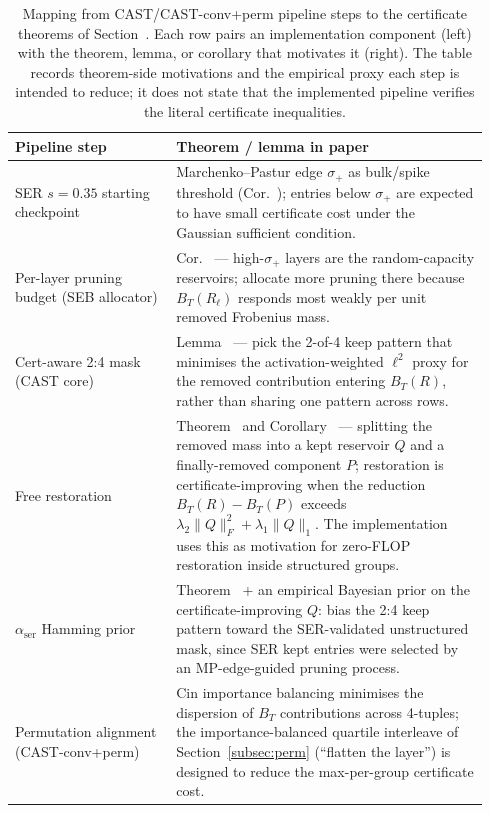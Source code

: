 \documentclass[11pt]{article}
\makeatletter
\theoremstyle{plain}
\theoremstyle{definition}
\theoremstyle{remark}
\newcommand{\1}{\mathbf{1}}
\newcommand{\mainref}[1]{\@ifundefined{r@main-#1}{\@ifundefined{r@#1}{\ref*{orone-#1}}{\ref{#1}}}{\ref*{main-#1}}}
\makeatother
\begin{document}
\begin{table}[ht]
\centering
\caption{Mapping from CAST/CAST-conv+perm pipeline steps to the certificate theorems of Section~\mainref{Main_theory_gen}.  Each row pairs an implementation component (left) with the theorem, lemma, or corollary that motivates it (right).  The table records theorem-side motivations and the empirical proxy each step is intended to reduce; it does not state that the implemented pipeline verifies the literal certificate inequalities.}
\label{tab:cast_theory_map}
\scriptsize
\setlength{\tabcolsep}{4pt}
\begin{tabular}{p{0.32\linewidth}p{0.62\linewidth}}
\toprule
Pipeline step & Theorem / lemma in paper \\
\midrule
SER \(s=0.35\) starting checkpoint
  & Marchenko--Pastur edge \(\sigma_+\) as bulk/spike threshold (Cor.~\mainref{cor:mp_edge_data_path_budget}); entries below \(\sigma_+\) are expected to have small certificate cost under the Gaussian sufficient condition. \\
\addlinespace[2pt]
Per-layer pruning budget (SEB allocator)
  & Cor.~\mainref{cor:mp_edge_data_path_budget} --- high-\(\sigma_+\) layers are the random-capacity reservoirs; allocate more pruning there because \(B_T(R_\ell)\) responds most weakly per unit removed Frobenius mass. \\
\addlinespace[2pt]
Cert-aware 2:4 mask (CAST core)
  & Lemma~\mainref{lem:deterministic_ce_path_bound} --- pick the 2-of-4 keep pattern that minimises the activation-weighted \(\ell^2\) proxy for the removed contribution entering \(B_T(R)\), rather than sharing one pattern across rows. \\
\addlinespace[2pt]
Free restoration
  & Theorem~\mainref{thm:deterministic_prune_restore_certificate} and Corollary~\mainref{cor:restoration_improves_certificate} --- splitting the removed mass into a kept reservoir \(Q\) and a finally-removed component \(P\); restoration is certificate-improving when the reduction \(B_T(R)-B_T(P)\) exceeds \(\lambda_2\|Q\|_F^2+\lambda_1\|Q\|_1\). The implementation uses this as motivation for zero-FLOP restoration inside structured groups. \\
\addlinespace[2pt]
\(\alpha_{\text{ser}}\) Hamming prior
  & Theorem~\mainref{thm:deterministic_prune_restore_certificate} + an empirical Bayesian prior on the certificate-improving \(Q\): bias the 2:4 keep pattern toward the SER-validated unstructured mask, since SER kept entries were selected by an MP-edge-guided pruning process. \\
\addlinespace[2pt]
Permutation alignment (CAST-conv+perm)
  & Cin importance balancing minimises the dispersion of \(B_T\) contributions across 4-tuples; the importance-balanced quartile interleave of Section~\ref{subsec:perm} (``flatten the layer'') is designed to reduce the max-per-group certificate cost. \\
\bottomrule
\end{tabular}
\end{table}
\end{document}

